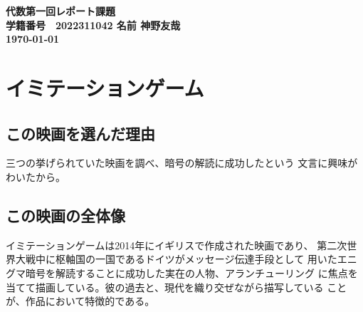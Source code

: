 \documentclass[a4j]{jarticle}
\begin{document}
\vfill
\begin{screen}
\begin{center}
\huge\bf 代数第一回レポート課題\\
\vspace{5mm}
\large\bf
学籍番号　2022311042 \quad 名前 神野友哉\\
\today
\end{center}
\end{screen}
\thispagestyle{empty}

%
\section{イミテーションゲーム}
\subsection{この映画を選んだ理由}
三つの挙げられていた映画を調べ、暗号の解読に成功したという
文言に興味がわいたから。

\subsection{この映画の全体像}
イミテーションゲームは2014年にイギリスで作成された映画であり、
第二次世界大戦中に枢軸国の一国であるドイツがメッセージ伝達手段として
用いたエニグマ暗号を解読することに成功した実在の人物、アランチューリング
に焦点を当てて描画している。彼の過去と、現代を織り交ぜながら描写している
ことが、作品において特徴的である。
\newpage
\end{document}
